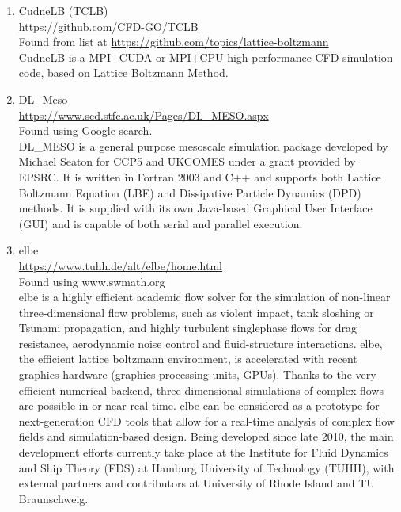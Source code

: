 \documentclass{article}
\begin{document}
\begin{enumerate}
	\item CudneLB (TCLB)\\
	\href{https://github.com/CFD-GO/TCLB}{https://github.com/CFD-GO/TCLB}\\
	Found from list at \href{https://github.com/topics/lattice-boltzmann}{https://github.com/topics/lattice-boltzmann}\\
	CudneLB is a MPI+CUDA or MPI+CPU high-performance CFD simulation code, based on Lattice Boltzmann Method.
	
	\item DL\_Meso \\
	\href{https://www.scd.stfc.ac.uk/Pages/DL_MESO.aspx}{https://www.scd.stfc.ac.uk/Pages/DL\_MESO.aspx} \\
	Found using Google search.\\
	DL\_MESO is a general purpose mesoscale simulation package developed by Michael Seaton for CCP5 and UKCOMES​ under a grant provided by EPSRC. It is written in Fortran 2003 and C++ and supports both Lattice Boltzmann Equation (LBE) and Dissipative Particle Dynamics (DPD) methods. It is supplied with its own Java-based Graphical User Interface (GUI) and is capable of both serial and parallel execution.
	
	\item elbe \\
	\href{https://www.tuhh.de/alt/elbe/home.html}{https://www.tuhh.de/alt/elbe/home.html}\\
	Found using www.swmath.org \\
	elbe is a highly efficient academic flow solver for the simulation of non-linear three-dimensional flow problems, such as violent impact, tank sloshing or Tsunami propagation, and highly turbulent singlephase flows for drag resistance, aerodynamic noise control and fluid-structure interactions. elbe, the efficient lattice boltzmann environment, is accelerated with recent graphics hardware (graphics processing units, GPUs). Thanks to the very efficient numerical backend, three-dimensional simulations of complex flows are possible in or near real-time. elbe can be considered as a prototype for next-generation CFD tools that allow for a real-time analysis of complex flow fields and simulation-based design. Being developed since late 2010, the main development efforts currently take place at the Institute for Fluid Dynamics and Ship Theory (FDS) at Hamburg University of Technology (TUHH), with external partners and contributors at University of Rhode Island and TU Braunschweig.
	

\end{enumerate}
\end{document}
